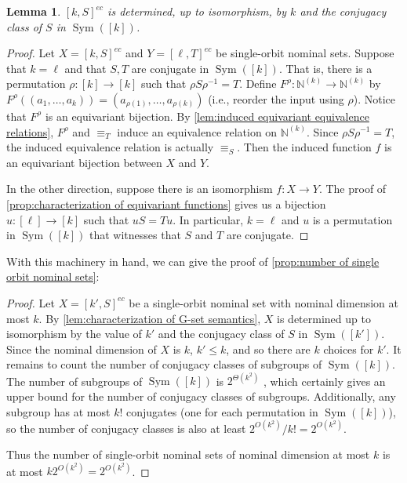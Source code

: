 \documentclass[11pt,a4paper]{amsart}
\newtheorem{lemma}{Lemma}
\theoremstyle{definition}
\newcommand{\bb}{\mathbb}
\DeclareMathOperator{\Sym}{Sym}
\begin{document}
\begin{lemma} \label{lem:characterization of G-set semantics}
    $[k,S]^{ec}$ is determined, up to isomorphism, by $k$ and the conjugacy class of $S$ in $\Sym([k])$. 
\end{lemma}

\begin{proof}
    Let $X = [k,S]^{ec}$ and $Y = [\ell,T]^{ec}$ be single-orbit nominal sets.
    Suppose that $k = \ell$ and that $S,T$ are conjugate in $\Sym([k])$. 
    That is, there is a permutation $\rho : [k] \to [k]$ such that $\rho S \rho^{-1} = T$. 
    Define $F^\rho : \bb N^{(k)} \to \bb N^{(k)}$ by $F^\rho((a_1, \ldots, a_k)) = (a_{\rho(1)}, \ldots, a_{\rho(k)})$ (i.e., reorder the input using $\rho$). 
    Notice that $F^\rho$ is an equivariant bijection.
    By \autoref{lem:induced equivariant equivalence relations}, $F^\rho$ and $\equiv_T$ induce an equivalence relation on $\bb N^{(k)}$.
    Since $\rho S \rho^{-1} = T$, the induced equivalence relation is actually $\equiv_S$. 
    Then the induced function $f$ is an equivariant bijection between $X$ and $Y$.
    
    In the other direction, suppose there is an isomorphism $f : X \to Y$.
    The proof of \autoref{prop:characterization of equivariant functions} gives us a bijection $u : [\ell] \to [k]$ such that $uS = Tu$. 
    In particular, $k=\ell$ and $u$ is a permutation in $\Sym([k])$ that witnesses that $S$ and $T$ are conjugate. 
\end{proof}

With this machinery in hand, we can give the proof of \autoref{prop:number of single orbit nominal sets}:

\begin{proof}
    Let $X = [k',S]^{ec}$ be a single-orbit nominal set with nominal dimension at most $k$. 
    By \autoref{lem:characterization of G-set semantics}, $X$ is determined up to isomorphism by the value of $k'$ and the conjugacy class of $S$ in $\Sym([k'])$. 
    Since the nominal dimension of $X$ is $k$, $k' \leq k$, and so there are $k$ choices for $k'$. It remains to count the number of conjugacy classes of subgroups of $\Sym([k])$. 
    The number of subgroups of $\Sym([k])$ is $2^{\Theta(k^2)}$ \cite[Theorem 4.2]{pyber:asymptotic-results-permutation-groups}, which certainly gives an upper bound for the number of conjugacy classes of subgroups. 
    Additionally, any subgroup has at most $k!$ conjugates (one for each permutation in $\Sym([k])$), so the number of conjugacy classes is also at least $2^{O(k^2)}/k! = 2^{O(k^2)}$.
    
    Thus the number of single-orbit nominal sets of nominal dimension at most $k$ is at most $k 2^{O(k^2)} = 2^{O(k^2)}$. 
\end{proof}
\end{document}
